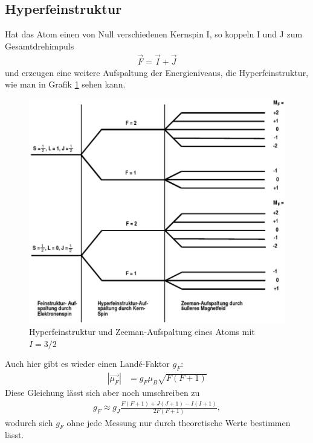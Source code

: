 \subsection{Hyperfeinstruktur}
Hat das Atom einen von Null verschiedenen Kernspin I, so koppeln I und J zum Gesamtdrehimpuls
\begin{align*}
\vec{F}=\vec{I}+\vec{J}
\end{align*}
und erzeugen eine weitere Aufspaltung der Energieniveaus, die Hyperfeinstruktur, wie man in Grafik \ref{pic_zeehyper} sehen kann.
\begin{figure}[h]
\includegraphics[scale=1]{../pics/zeehyper.pdf}
\caption{Hyperfeinstruktur und Zeeman-Aufspaltung eines Atoms mit $I=3/2$}
\label{pic_zeehyper}
\end{figure}
Auch hier gibt es wieder einen Landé-Faktor $g_F$:
\begin{align*}
|\vec{\mu_F}|&=g_F \mu_B \sqrt{F(F+1)}
\end{align*}
Diese Gleichung lässt sich aber noch umschreiben zu
\begin{align}
g_F\approx g_J \frac{F(F+1)+J(J+1)-I(I+1)}{2F(F+1)},
\end{align}
wodurch sich $g_F$ ohne jede Messung nur durch theoretische Werte bestimmen lässt.


